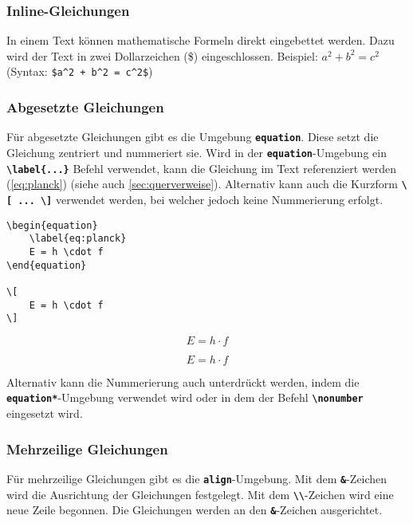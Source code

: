\subsubsection{Inline-Gleichungen}
In einem Text können mathematische Formeln direkt eingebettet werden. Dazu wird der Text in zwei Dollarzeichen (\$) eingeschlossen.
Beispiel: $a^2 + b^2 = c^2$ (Syntax: \texttt{\$a\^{}2 + b\^{}2 = c\^{}2\$})

\subsubsection{Abgesetzte Gleichungen}
Für abgesetzte Gleichungen gibt es die Umgebung \textbf{\texttt{equation}}. Diese setzt die Gleichung zentriert und nummeriert sie.
Wird in der \textbf{\texttt{equation}}-Umgebung ein \textbf{\texttt{\textbackslash label\{...\}}} Befehl verwendet, kann die Gleichung im Text referenziert werden (\autoref{eq:planck}) (siehe auch \ref{sec:querverweise}).
Alternativ kann auch die Kurzform \textbf{\texttt{\textbackslash [ ... \textbackslash ]}} verwendet werden, bei welcher jedoch keine Nummerierung erfolgt.

\begin{minipage}{0.5\textwidth}
    \begin{lstlisting}
\begin{equation}
    \label{eq:planck}
    E = h \cdot f
\end{equation}

\[
    E = h \cdot f
\]

\end{lstlisting}
\end{minipage}
\hfill
\begin{minipage}{0.5\textwidth}
    \begin{equation}
        \label{eq:planck}
        E = h \cdot f
    \end{equation}

    \[
        E = h \cdot f
    \]
\end{minipage}
Alternativ kann die Nummerierung auch unterdrückt werden, indem die \textbf{\texttt{equation*}}-Umgebung verwendet wird oder in dem der Befehl \textbf{\texttt{\textbackslash nonumber}} eingesetzt wird.

\subsubsection{Mehrzeilige Gleichungen}
Für mehrzeilige Gleichungen gibt es die \textbf{\texttt{align}}-Umgebung. Mit dem \textbf{\texttt{\&}}-Zeichen wird die Ausrichtung der Gleichungen festgelegt. Mit dem \textbf{\texttt{\textbackslash\textbackslash}}-Zeichen wird eine neue Zeile begonnen. Die Gleichungen werden an den \textbf{\texttt{\&}}-Zeichen ausgerichtet.


